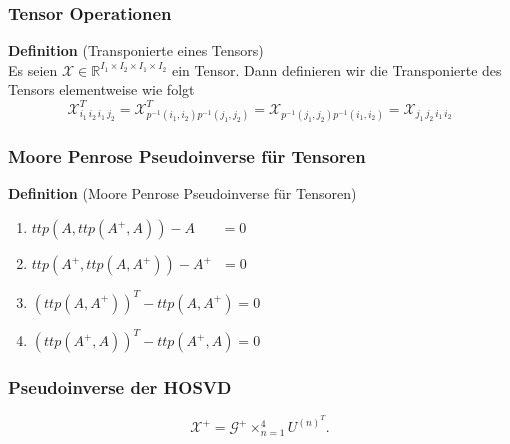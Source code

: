 \begin{frame}
\frametitle{Tensor Operationen}
\begin{framed} \textbf{Definition} (Transponierte eines Tensors) \\
Es seien $\pmb{\mathcal{X}} \in \mathbb{R}^{I_1 \times I_2 \times I_1 \times I_2}$ ein Tensor.
Dann definieren wir die Transponierte des Tensors elementweise wie folgt
\begin{equation*}
\mathcal{X}_{i_1 \, i_2 \, i_1 \, j_2}^T = \mathcal{X}_{p^{-1}(i_1,i_2)p^{-1}(j_1,j_2)}^T=\mathcal{X}_{p^{-1}(j_1,j_2)p^{-1}(i_1,i_2)} =\mathcal{X}_{ j_1 \, j_2 \, i_1 \, i_2}
\end{equation*}
\end{framed}
\end{frame}


\begin{frame}
\frametitle{Moore Penrose Pseudoinverse für Tensoren}
\begin{framed} \textbf{Definition} (Moore Penrose Pseudoinverse für Tensoren) \\
\begin{enumerate}
\item $ttp(A,ttp(A^{+},A))-A \, \, \, \, \, \, \, \, \, \, \, = 0$
\item $ttp(A^{+},ttp(A,A^{+}))-A^{+} \, \,  \, \, = 0 $
\item $(ttp(A,A^{+}))^{T}-ttp(A,A^{+}) = 0$
\item $(ttp(A^{+},A))^{T}-ttp(A^{+},A) = 0$
\end{enumerate}
\end{framed}
\end{frame}

\begin{frame}
\frametitle{Pseudoinverse der HOSVD}
\begin{framed}
\begin{equation*} 
\pmb{\mathcal{X}}^{+} = \pmb{\mathcal{G}}^{+} \times_{n=1}^{4} U^{ (n) ^{T} }.
\end{equation*}
\end{framed}

\end{frame}